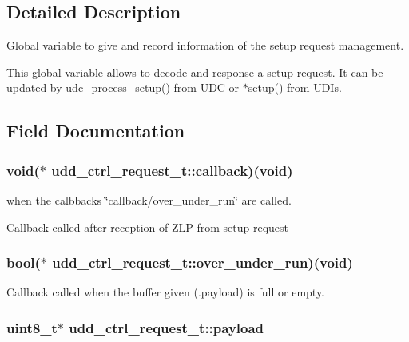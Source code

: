 \subsection{\-Detailed \-Description}
\-Global variable to give and record information of the setup request management. 

\-This global variable allows to decode and response a setup request. \-It can be updated by \hyperlink{group__udc__group_ga58c2916d7984e0e5b2143cadf4af6080}{udc\-\_\-process\-\_\-setup()} from \-U\-D\-C or $\ast$setup() from \-U\-D\-Is. 

\subsection{\-Field \-Documentation}
\hypertarget{structudd__ctrl__request__t_a942a0402e868519a5ce6864941dd939e}{
\subsubsection[{callback}]{\setlength{\rightskip}{0pt plus 5cm}void($\ast$ {\bf udd\-\_\-ctrl\-\_\-request\-\_\-t\-::callback})(void)}}
\label{structudd__ctrl__request__t_a942a0402e868519a5ce6864941dd939e}


when the calbbacks \char`\"{}callback/over\-\_\-under\-\_\-run\char`\"{} are called. 

\-Callback called after reception of \-Z\-L\-P from setup request \hypertarget{structudd__ctrl__request__t_afb9dab5e58e325dae17ea02345b097c4}{
\subsubsection[{over\-\_\-under\-\_\-run}]{\setlength{\rightskip}{0pt plus 5cm}bool($\ast$ {\bf udd\-\_\-ctrl\-\_\-request\-\_\-t\-::over\-\_\-under\-\_\-run})(void)}}
\label{structudd__ctrl__request__t_afb9dab5e58e325dae17ea02345b097c4}
\-Callback called when the buffer given (.payload) is full or empty. \hypertarget{structudd__ctrl__request__t_a30ee45cc3e128d219f779f32635b6ca0}{
\subsubsection[{payload}]{\setlength{\rightskip}{0pt plus 5cm}uint8\-\_\-t$\ast$ {\bf udd\-\_\-ctrl\-\_\-request\-\_\-t\-::payload}}}
\label{structudd__ctrl__request__t_a30ee45cc3e128d219f779f32635b6ca0}


